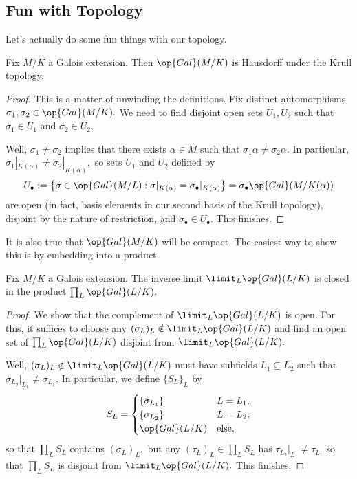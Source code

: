 \subsection{Fun with Topology}
Let's actually do some fun things with our topology.
\begin{proposition}
	Fix $M/K$ a Galois extension. Then $\op{Gal}(M/K)$ is Hausdorff under the Krull topology.
\end{proposition}
\begin{proof}
	This is a matter of unwinding the definitions. Fix distinct automorphisms $\sigma_1,\sigma_2\in\op{Gal}(M/K).$ We need to find disjoint open sets $U_1,U_2$ such that $\sigma_1\in U_1$ and $\sigma_2\in U_2.$

	Well, $\sigma_1\ne\sigma_2$ implies that there exists $\alpha\in M$ such that $\sigma_1\alpha\ne\sigma_2\alpha.$ In particular, $\sigma_1|_{K(\alpha)}\ne\sigma_2|_{K(\alpha)},$ so sets $U_1$ and $U_2$ defined by
	\[U_\bullet:=\left\{\sigma\in\op{Gal}(M/L):\sigma|_{K(\alpha)}=\sigma_\bullet|_{K(\alpha)}\right\}=\sigma_\bullet\op{Gal}(M/K(\alpha))\]
	are open (in fact, basis elements in our second basis of the Krull topology), disjoint by the nature of restriction, and $\sigma_\bullet\in U_\bullet.$ This finishes.
\end{proof}
It is also true that $\op{Gal}(M/K)$ will be compact. The easiest way to show this is by embedding into a product.
\begin{proposition} \label{prop:limitclosed}
	Fix $M/K$ a Galois extension. The inverse limit $\limit_L\op{Gal}(L/K)$ is closed in the product $\prod_L\op{Gal}(L/K).$
\end{proposition}
\begin{proof}
	We show that the complement of $\limit_L\op{Gal}(L/K)$ is open. For this, it suffices to choose any $(\sigma_L)_L\notin\limit_L\op{Gal}(L/K)$ and find an open set of $\prod_L\op{Gal}(L/K)$ disjoint from $\limit_L\op{Gal}(L/K).$

	Well, $(\sigma_L)_L\notin\limit_L\op{Gal}(L/K)$ must have subfields $L_1\subseteq L_2$ such that $\sigma_{L_2}|_{L_1}\ne\sigma_{L_1}.$ In particular, we define $\{S_L\}_L$ by
	\[S_L=\begin{cases}
		\{\sigma_{L_1}\} & L=L_1, \\
		\{\sigma_{L_2}\} & L=L_2, \\
		\op{Gal}(L/K) & \text{else},
	\end{cases}\]
	so that $\prod_LS_L$ contains $(\sigma_L)_L,$ but any $(\tau_L)_L\in\prod_LS_L$ has $\tau_{L_2}|_{L_1}\ne\tau_{L_1}$ so that $\prod_LS_L$ is disjoint from $\limit_L\op{Gal}(L/K).$ This finishes.
\end{proof}
